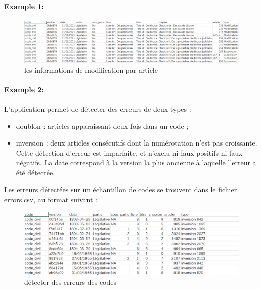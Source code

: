 \documentclass[
  oneside]{book}
\providecommand{\tightlist}{%
  \setlength{\itemsep}{0pt}\setlength{\parskip}{0pt}}
\begin{document}
\hypertarget{example-1}{%
\paragraph{Example 1:}\label{example-1}}

\begin{figure}

{\centering \includegraphics[width=0.8\linewidth]{images/diff} 

}

\caption{les informations de modification par article}\label{fig:diff}
\end{figure}

\hypertarget{example-2}{%
\paragraph{Example 2:}\label{example-2}}

L'application permet de détecter des erreurs de deux types :

\begin{itemize}
\tightlist
\item
  doublon : articles apparaissant deux fois dans un code ;
\item
  inversion : deux articles consécutifs dont la numérotation n'est pas croissante.
  Cette détection d'erreur est imparfaite, et n'exclu ni faux-positifs ni faux-négatifs. La date correspond à la version la plus ancienne à laquelle l'erreur a été détectée.
\end{itemize}

Les erreurs détectées sur un échantillon de codes se trouvent dans le fichier errors.csv, au format suivant :

\begin{figure}

{\centering \includegraphics[width=0.8\linewidth]{images/check} 

}

\caption{détecter des erreurs des codes}\label{fig:check}
\end{figure}
\end{document}
